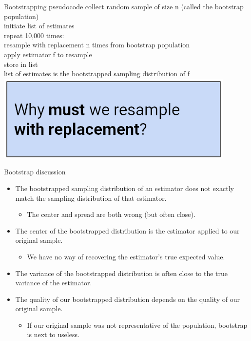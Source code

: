 \documentclass[aspectratio=169]{../latex_main/tntbeamer}  %
\begin{document}
	
	\begin{frame}{Bootstrapping pseudocode}
	    collect random sample of size n (called the bootstrap population)\\
        initiate list of estimates\\
        repeat 10,000 times:\\
        \hspace{2cm} resample with replacement n times from bootstrap population\\
        \hspace{1cm} apply estimator f to resample\\
        \hspace{1cm} store in list\\
        list of estimates is the bootstrapped sampling distribution of f\\
        \hfill\includegraphics[scale=.5]{Bild5}


	\end{frame}
	
	\begin{frame}{Bootstrap discussion}
	    \begin{itemize}
	        \item The bootstrapped sampling distribution of an estimator does not exactly match the sampling distribution of that estimator.
	        \begin{itemize}
	            \item The center and spread are both wrong (but often close).
	        \end{itemize}
	        \item The center of the bootstrapped distribution is the estimator applied to our original sample.
	        \begin{itemize}
	            \item We have no way of recovering the estimator’s true expected value.
	        \end{itemize}
	        \item The variance of the bootstrapped distribution is often close to the true variance of the estimator.
	        \item The quality of our bootstrapped distribution depends on the quality of our original sample.
	        \begin{itemize}
	            \item If our original sample was not representative of the population, bootstrap is next to useless.
	        \end{itemize}
	    \end{itemize}
	\end{frame}
	
\end{document}
